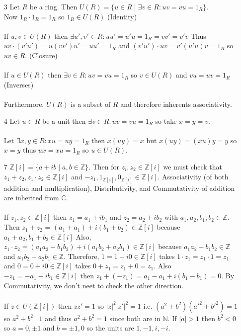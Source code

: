 \documentclass[12pt]{extarticle}
\newcommand{\Z}{\mathbb{Z}}
\newcommand{\C}{\mathbb{C}}
\begin{document}
\begin{enumerate}
\begin{enumerate}
\item[3] Let $R$ be a ring. Then $U(R) = \{ u \in R \mid \exists v \in R : uv = vu = 1_R \}$. \\ Now $1_R \cdot 1_R = 1_R$ so $1_R \in U(R)$ (Identity) \\ \\ 
If $u, v \in U(R)$ then $\exists u', v' \in R : uu' = u'u = 1_R = vv' = v'v$ Thus $uv \cdot (v'u') = u(vv')u' = uu' = 1_R$ and $(v'u') \cdot uv = v'(u'u)v = 1_R$ so $uv \in R$. (Closure) \\ \\
If $u \in U(R)$ then $\exists v \in R : uv = vu = 1_R$ so $v \in U(R)$ and $vu = uv = 1_R$ (Inverses) \\ \\
Furthermore, $U(R)$ is a subset of $R$ and therefore inherents associativity.  

\item[4] Let $u \in R$ be a unit then $\exists v \in R : uv = vu = 1_R$ so take $ x = y = v$. \\ \\ Let $\exists x, y \in R : xu = uy = 1_R$ then $x(uy) = x$ but $x(uy) = (xu)y = y$ so $x = y$ thus $ux = xu = 1_R$ so $u \in U(R)$. 

\item[7] $\Z[i] = \{a + ib \mid a, b \in \Z \}$. Then for $z_i, z_2 \in \Z[i]$ we must check that $z_1 + z_2, z_1 \cdot z_2 \in \Z[i]$ and $-z_1, 1_{\Z[i]}, 0_{\Z[i]} \in \Z[i]$. Associativity (of both addition and multiplication), Distributivity, and Commutativity of addition are inherited from $\C$. \\ \\
If $z_1, z_2 \in \Z[i]$ then $z_1 = a_1 + ib_1$ and $z_2 = a_2 + ib_2$ with $a_1, a_2, b_1, b_2 \in \Z$. Then $z_1 + z_2$ = $(a_1 + a_1) + i(b_1 + b_2) \in \Z[i]$ because $a_1 + a_2, b_1 + b_2 \in \Z[i]$ Also, $z_1 \cdot z_2 = (a_1 a_2 - b_1 b_2) + i(a_1b_2  + a_2 b_1) \in \Z[i]$ because $a_1 a_2 - b_1 b_2 \in \Z$ and $a_1b_2  + a_2 b_1 \in \Z$. Therefore, $1 = 1+i0 \in \Z[i]$ takes $1 \cdot z_1 = z_1 \cdot 1 = z_1$ and $0 = 0 + i0 \in \Z[i]$ takes $0 + z_1 = z_1 + 0 = z_1$. Also $-z_1 = -a_1 - i b_1 \in \Z[i]$ then $z_1 + (-z_1) = a_1 - a_1 + i(b_1 - b_1) = 0$. By Commutativity, we don't neet to check the other direction. \\ \\
If $z \in U(\Z[i])$ then $zz' = 1$ so $|z|^2 |z'|^2 = 1$ i.e. $(a^2 + b^2)(a'^2 + b'^2) = 1$ so $a^2 + b^2 \mid 1$ and thus $a^2 + b^2 = 1$ since both are in $\mathbb{N}$. If $|a| > 1$ then $b^2 < 0$ so $a = 0, \pm 1$ and $b = \pm 1, 0$ so the units are $1,-1, i,-i$. 


\end{enumerate}
\end{enumerate}
\end{document}
